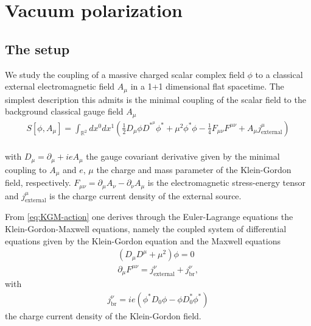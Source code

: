 \chapter{Vacuum polarization}

\section{The setup}

We study the coupling of a massive charged scalar complex field $\phi$ to a classical external electromagnetic field $A_\mu$ in a 1+1 dimensional flat spacetime. The simplest description this admits is the minimal coupling of the scalar field to the background classical gauge field $A_\mu$
\begin{align}
	S [\phi, A_\mu] = \int_{\mathbb{R}^2}^{} dx^{0}dx^{1} \left( \frac{1}{2}D_\mu \phi D^*^{\mu}\phi^* 
	+ \mu^2\phi^* \phi - \frac{1}{4}F_{\mu\nu} F^{\mu\nu} + A_\mu j_{\text{external}}^{\mu} \right)  	
	\label{eq:KGM-action}
\end{align}
 \\
with $D_\mu = \partial_\mu + ieA_\mu$ the gauge covariant derivative given by the minimal coupling to $A_\mu$ and  $e$, $\mu$ the charge and mass parameter of the Klein-Gordon field, respectively. $F_{\mu\nu} = \partial_\mu A_\nu - \partial_\nu A_\mu$ is the electromagnetic stress-energy tensor and $j_{\text{external}}^\mu$ is the charge current density of the external source.

From \eqref{eq:KGM-action}  one derives through the Euler-Lagrange equations the Klein-Gordon-Maxwell equations, namely the coupled system of differential equations given by the Klein-Gordon equation and the Maxwell equations
\begin{subequations}
	\begin{align}
			\left( D_\mu D^\mu + \mu^2  \right) \phi = 0 
		\label{eq:klein-gordon-equation}\\
			\partial_\mu F^{\mu\nu}= j_{\text{external}}^{\nu} + j_\text{br}^{\nu} ,
		\label{eq:quantum-maxwell-equation}
	\end{align}
\end{subequations}
with 
\begin{align}
	j^{\nu}_{\text{br}} = ie\left( \phi^* D_0 \phi - \phi D_0^* \phi^* \right) 
\end{align}
the charge current density of the Klein-Gordon field. 



